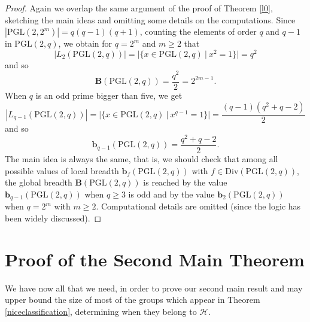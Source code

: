 \documentclass{amsart}
\theoremstyle{definition}
\numberwithin{equation}{section}
\begin{document}
\begin{proof} Again we overlap the same argument of the proof of Theorem \ref{l0}, sketching the main ideas and omitting some details on the computations. Since $|\mathrm{PGL}(2,2^m)|=q(q-1)(q+1)$, counting the elements of order $q$ and $q-1$ in $\mathrm{PGL}(2,q)$, we obtain for  $q=2^m$ and $m\ge2$ that 
\begin{equation}
|L_2(\mathrm{PGL}(2,q))| =|\{x \in \mathrm{PGL}(2,q) \  | \ x^2=1\}| = {q^{2}} \end{equation} and so
\begin{equation} 
\mathbf{B}(\mathrm{PGL}(2,q)) = \frac{q^2}{2} =2^{2m-1}.
\end{equation}
When $q$ is an odd prime bigger than five, we get
\begin{equation} 
|L_{q-1}(\mathrm{PGL}(2,q))|=|\{x \in \mathrm{PGL}(2,q) \ | \ x^{q-1}=1\}|=\frac{(q-1)(q^2+q-2)}{2}
\end{equation}
and so \begin{equation} 
\mathbf{b}_{q-1}(\mathrm{PGL}(2,q))=\frac{q^2+q-2}{2}.
\end{equation}
 The main idea is always the same, that is,  we should check that among all possible values of local breadth $\mathbf{b}_f(\mathrm{PGL}(2,q))$ with $f \in \mathrm{Div}(\mathrm{PGL}(2,q))$, the global breadth $\mathbf{B}(\mathrm{PGL}(2,q))$ is reached by the value $\mathbf{b}_{q-1}(\mathrm{PGL}(2,q))$  when $q\geq 3$ is odd and by the value $\mathbf{b}_{2}(\mathrm{PGL}(2,q))$  when $q=2^m$ with $m\ge2$. Computational details are omitted (since the logic has been widely discussed).
\end{proof}





\section{Proof of the Second Main Theorem}



We have now all that we need, in order to prove our second main result and may upper bound the size of most of the groups which appear in Theorem \ref{niceclassification}, determining when they belong to $\mathcal{H}$.
\end{document}
